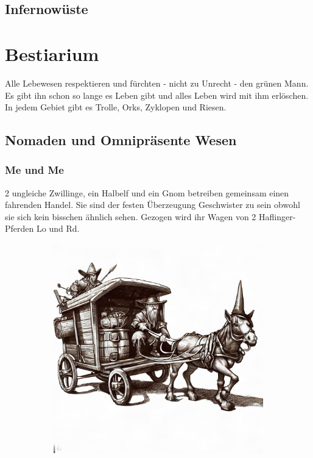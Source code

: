 \documentclass[11pt, twoside]{article}
\begin{document}
\subsection{Infernowüste}
\label{sec:org30ce7ed}

\newpage

\section{Bestiarium}
\label{sec:org04d59c4}
Alle Lebewesen respektieren und fürchten - nicht zu Unrecht - den grünen Mann. Es gibt ihn schon so lange es Leben gibt und alles Leben wird mit ihm erlöschen.
In jedem Gebiet gibt es Trolle, Orks, Zyklopen und Riesen.

\clearpage

\subsection{Nomaden und Omnipräsente Wesen}
\label{sec:orgebbc9aa}
\subsubsection{Me und Me\label{meme}}
\label{sec:orgd52ea3c}
2 ungleiche Zwillinge, ein Halbelf und ein Gnom betreiben gemeinsam einen fahrenden Handel. Sie sind der festen Überzeugung Geschwister zu sein obwohl sie sich kein bisschen ähnlich sehen. Gezogen wird ihr Wagen von 2 Haflinger-Pferden Lo und Rd.
\begin{figure}[H]
\centering
\caption{Die Händler Me und Me}
\label{fig:meme}
  \begin{subfigure}{0.5\textwidth}
    \centering
    \includegraphics[width=0.99\linewidth]{meme.jpeg}
  \end{subfigure}
\end{figure}
\end{document}

